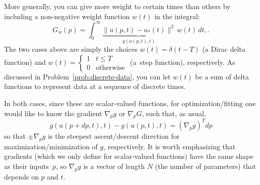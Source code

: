 More generally, you can give more weight to certain times than others
by including a non-negative weight function $w(t)$ in the integral:
$$G_w(p)=\int_0^\infty \underbrace{\|u(p,t)-u_*(t)\|^2}_{g(u(p,t),t)}  \, w(t) \, dt , .$$
The two cases above are simply the choices $w(t) = \delta(t-T)$ (a Dirac delta function) and $w(t) = \begin{cases} 1 & t \le T \\ 0 & \text{otherwise} \end{cases}$ (a~step function), respectively.
As discussed in Problem~\ref{prob:discrete-data}, you can let $w(t)$ be a sum of delta functions to represent data at a sequence of discrete times.

In both cases, since these are scalar-valued functions, for optimization/fitting
one would like to know the gradient $\nabla_{p}g$ or $\nabla_{p}G$,
such that, as usual,  
\[
g(u(p+dp,t),t)-g(u(p,t),t)=\left(\nabla_{p}g\right)^{T}dp
\]
so that $\pm\nabla_{p}g$ is the steepest ascent/descent direction
for maximization/minimization of $g$, respectively.
It is worth emphasizing that gradients (which we only define for scalar-valued functions) have the same shape as their inputs~$p$, so 
$\nabla_p g $ is a vector of length
$N$ (the number of parameters)  that depends on $p$ and $t$.

